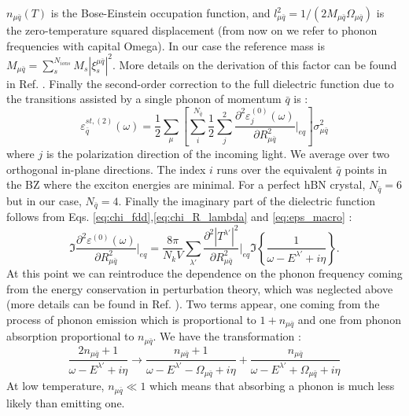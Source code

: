 $n_{\mu\bar{q}}(T)$ is the Bose-Einstein occupation function, and $l^2_{\mu\bar{q}} = 1/(2M_{\mu\bar{q}}\Omega_{\mu\bar{q}})$ is the zero-temperature squared displacement (from now on we refer to phonon frequencies with capital Omega). In our case the reference mass is $M_{\mu\bar{q}} = \sum^{N_{ions}}_s M_s |\xi_s^{\mu\bar{q}}|^2$. More details on the derivation of this factor can be found in Ref. \cite{zacharias2020theory}. Finally the second-order correction to the full dielectric function due to the transitions assisted by a single phonon of momentum $\bar{q}$ is :
\begin{equation}
	\varepsilon^{st,(2)}_{\bar{q}} (\omega) = \frac{1}{2} \sum_\mu \left[ \sum_i^{N_{\bar{q}}} \frac{1}{2} \sum_j^2 \frac{\partial^2 \varepsilon^{(0)}_j(\omega)}{\partial R^2_{\mu\bar{q}}} \biggr|_{eq} \right] \sigma^2_{\mu\bar{q}} \label{eq:eps_Taylor_2nd}
\end{equation}
where $j$ is the polarization direction of the incoming light. We average over two orthogonal in-plane directions. The index $i$ runs over the equivalent $\bar{q}$ points in the \acrshort{BZ} where the exciton energies are minimal. For a perfect \acrshort{hBN} crystal, $N_{\bar{q}} = 6$ but in our case, $N_{\bar{q}} = 4$. 
Finally the imaginary part of the dielectric function follows from Eqs. \eqref{eq:chi_fdd},\eqref{eq:chi_R_lambda} and \eqref{eq:eps_macro} : 
\begin{equation}
	\Im\frac{\partial^2 \varepsilon^{(0)}(\omega)}{\partial R^2_{\mu\bar{q}}}\biggr|_{eq} = \frac{8\pi}{N_k V} \sum_{\lambda'} \frac{\partial^2 |T^{\lambda'}|^2}{\partial R^2_{\mu\bar{q}}}\biggr|_{eq} \Im\left\{ \frac{1}{\omega - E^{\lambda'} + i\eta} \right\}.
\end{equation}
At this point we can reintroduce the dependence on the phonon frequency coming from the energy conservation in perturbation theory, which was neglected above (more details can be found in Ref. \cite{paleari2019first}). Two terms appear, one coming from the process of phonon emission which is proportional to $1 + n_{\mu\bar{q}}$ and one from phonon absorption proportional to $n_{\mu\bar{q}}$. We have the transformation :
\begin{equation}
	\frac{2n_{\mu\bar{q}} + 1}{\omega - E^{\lambda'} + i\eta} \to \frac{n_{\mu\bar{q}} + 1}{\omega - E^{\lambda'} - \Omega_{\mu\bar{q}} + i\eta} + \frac{n_{\mu\bar{q}}}{\omega - E^{\lambda'} + \Omega_{\mu\bar{q}} + i\eta}
\end{equation}
At low temperature, $n_{\mu\bar{q}} \ll 1$ which means that absorbing a phonon is much less likely than emitting one. 
